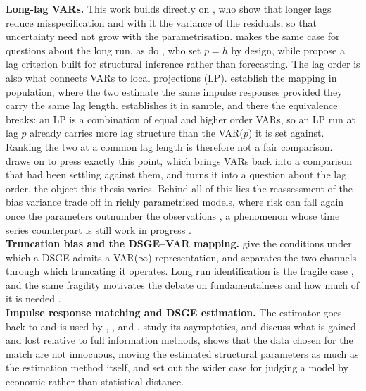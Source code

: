 \documentclass[12pt, a4paper]{article}
\begin{document}
\textbf{Long-lag VARs.}
This work builds directly on \citet{Long_Lag2025}, who show that longer lags reduce misspecification and with it the
variance of the residuals, so that uncertainty need not grow with the parametrisation.
\citet{Baumeister2025} makes the same case for questions about the long run, as do
\citet{Antolin-Diaz_Surico2025}, who set $p = h$ by design, while
\citet{GonzalezCasasus_Schorfheide2025} propose a lag criterion built for structural inference
rather than forecasting. The lag order is also what connects VARs to local projections (LP).
\citet{Plagborg-Moller_Wolf2021} establish the mapping in population, where the two estimate the
same impulse responses provided they carry the same lag length. \citet{Ludwig2026} establishes it
in sample, and there the equivalence breaks: an LP is a combination of equal and higher order VARs,
so an LP run at lag $p$ already carries more lag structure than the VAR($p$) it is set against.
Ranking the two at a common lag length \citep{Li_PlagborgMoller_Wolf2024,
Montiel-Olea_Plagborg-Moller_Qian_Wolf2025} is therefore not a fair comparison.
\citet{Baumeister2025} draws on \citet{Ludwig2026} to press exactly this point, which brings VARs
back into a comparison that had been settling against them, and turns it into a question about the
lag order, the object this thesis varies. Behind all
of this lies the reassessment of the bias variance trade off in richly parametrised models, where
risk can fall again once the parameters outnumber the observations
\citep{Belkin_Hsu_Ma_Mandal2019_Bias_Variance_tradeoff}, a phenomenon whose time series counterpart
is still work in progress \citep{AntolinDiaz_FernandezVillaverde_GuerronQuintana2026}.
\\

\textbf{Truncation bias and the DSGE--VAR mapping.}
\citet{FVRRSS2007} give the conditions under which a DSGE admits a VAR($\infty$) representation,
and \citet{Ravenna2007} separates the two channels through which truncating it operates. Long run
identification is the fragile case \citep{Faust_Leeper1997, Erceg_Guerrieri_Gust2005, CEV2007,
ChariKehoeMcGrattan2008}, and the same fragility motivates the debate on fundamentalness and how
much of it is needed \citep{Lippi_Reichlin1993, Forni_Gambetti_Sala2016}.
\\

\textbf{Impulse response matching and DSGE estimation.}
The estimator goes back to \citet{RotembergWoodford1997} and is used by \citet{CEE2005},
\citet{Iacoviello2005}, \citet{BoivinGiannoni2006} and \citet{ACEL2011}.
\citet{Hall_Inoue_Nason_Rossi2012} study its asymptotics, \citet{Giacomini2013} and
\citet{Theodoridis2011} discuss what is gained and lost relative to full information methods,
\citet{GuerronQuintana2010} shows that the data chosen for the match are not innocuous, moving
the estimated structural parameters as much as the estimation method itself, and
\citet{Canova1994, Canova2007} set out the wider case for judging a model by economic rather than
statistical distance.
\end{document}
